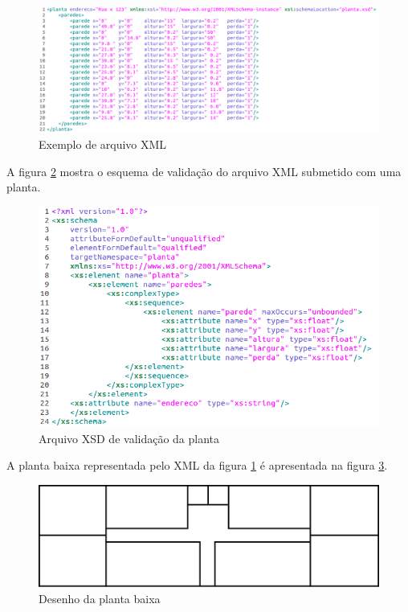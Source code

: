 \documentclass[tc,twoside]{iiufrgs}
\begin{document}
\begin{figure}[h]
	\centering
	\includegraphics[scale=0.4]{img/exXml.png}
	\caption{Exemplo de arquivo XML}
	\label{fig:exemploXml}
\end{figure}

A figura \ref{fig:exemploXsd} mostra o esquema de validação do arquivo XML submetido com uma planta. 

\begin{figure}[h]
	\centering
	\includegraphics[scale=0.5]{img/exXsd.png}
	\caption{Arquivo XSD de validação da planta}
	\label{fig:exemploXsd}
\end{figure}

A planta baixa representada pelo XML da figura \ref{fig:exemploXml} é apresentada na figura \ref{fig:desenhoPlantaBaixa}.

\begin{figure}[!h]
	\centering
	\includegraphics[scale=0.4]{img/plantaBaixaExemplo.png}
	\caption{Desenho da planta baixa}
	\label{fig:desenhoPlantaBaixa}
\end{figure}
\end{document}
